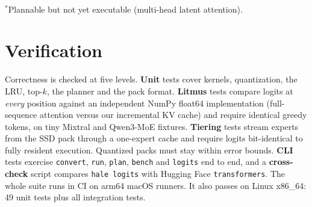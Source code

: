 \documentclass[11pt]{article}
\begin{document}
\begin{table}[t]
\centering
\caption{Planner estimates of decode tokens/s (\texttt{q4\_0} experts, bf16 dense weights, SSD at
5\,GB/s), reproduced with \texttt{hale plan --compare}. RAM: all experts resident. SSD: streamed.
--: dense weights do not fit. SSD figures are floors that assume uniform routing.}
\label{tab:plan}
\small
\setlength{\tabcolsep}{4pt}
\\[2pt]
{\footnotesize $^\ast$Plannable but not yet executable (multi-head latent attention).}
\end{table}

\section{Verification}
\label{sec:verification}

Correctness is checked at five levels. \textbf{Unit} tests cover kernels, quantization, the
LRU, top-$k$, the planner and the pack format. \textbf{Litmus} tests compare logits at
\emph{every} position against an independent NumPy float64 implementation (full-sequence
attention versus our incremental KV cache) and require identical greedy tokens, on tiny
Mixtral and Qwen3-MoE fixtures. \textbf{Tiering} tests stream experts from the SSD pack
through a one-expert cache and require logits bit-identical to fully resident execution.
Quantized packs must stay within error bounds. \textbf{CLI} tests exercise \texttt{convert},
\texttt{run}, \texttt{plan}, \texttt{bench} and \texttt{logits} end to end, and a
\textbf{cross-check} script compares \texttt{hale logits} with Hugging Face
\texttt{transformers}. The whole suite runs in CI on arm64 macOS runners. It also passes on
Linux x86\_64: 49 unit tests plus all integration tests.
\end{document}
